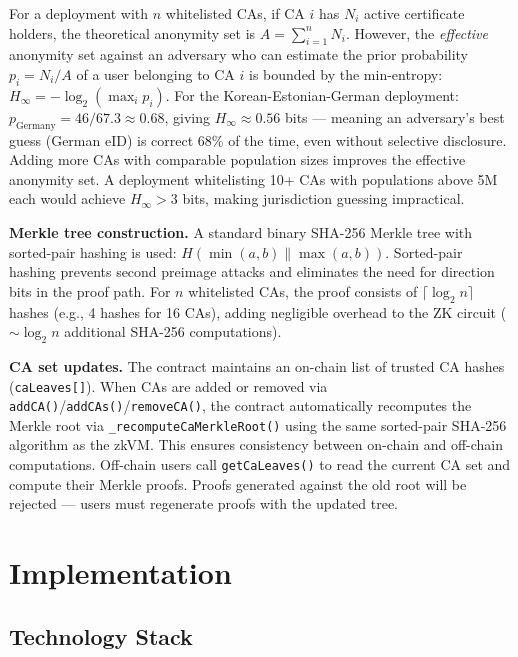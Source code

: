 \documentclass[11pt, a4paper]{article}
\begin{document}
For a deployment with \(n\) whitelisted CAs, if CA \(i\) has \(N_i\)
active certificate holders, the theoretical anonymity set is
\(A = \sum_{i=1}^{n} N_i\). However, the \emph{effective} anonymity set
against an adversary who can estimate the prior probability
\(p_i = N_i / A\) of a user belonging to CA \(i\) is bounded by the
min-entropy: \(H_\infty = -\log_2(\max_i p_i)\). For the
Korean-Estonian-German deployment:
\(p_{\text{Germany}} = 46/67.3 \approx 0.68\), giving
\(H_\infty \approx 0.56\) bits --- meaning an adversary's best guess
(German eID) is correct 68\% of the time, even without selective
disclosure. Adding more CAs with comparable population sizes improves
the effective anonymity set. A deployment whitelisting 10+ CAs with
populations above 5M each would achieve \(H_\infty > 3\) bits, making
jurisdiction guessing impractical.

\textbf{Merkle tree construction.} A standard binary SHA-256 Merkle tree
\cite{ref25} with sorted-pair hashing is used:
\(H(\min(a,b) \| \max(a,b))\). Sorted-pair hashing prevents second
preimage attacks and eliminates the need for direction bits in the proof
path. For \(n\) whitelisted CAs, the proof consists of
\(\lceil \log_2 n \rceil\) hashes (e.g., 4 hashes for 16 CAs), adding
negligible overhead to the ZK circuit ($\sim${}\(\log_2 n\)
additional SHA-256 computations).

\textbf{CA set updates.} The contract maintains an on-chain list of
trusted CA hashes (\texttt{caLeaves{[}{]}}). When CAs are added or
removed via \texttt{addCA()}/\texttt{addCAs()}/\texttt{removeCA()}, the
contract automatically recomputes the Merkle root via
\texttt{\_recomputeCaMerkleRoot()} using the same sorted-pair SHA-256
algorithm as the zkVM. This ensures consistency between on-chain and
off-chain computations. Off-chain users call \texttt{getCaLeaves()} to
read the current CA set and compute their Merkle proofs. Proofs
generated against the old root will be rejected --- users must
regenerate proofs with the updated tree.


\section{Implementation}\label{implementation}

\subsection{Technology Stack}\label{technology-stack}
\end{document}
